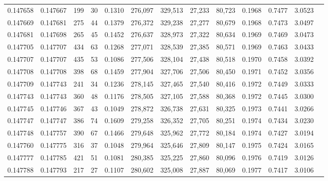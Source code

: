 \begin{tabular}{rrrrrrrrrrrrr}
0.147658 & 0.147667 &   199 &  30 &                                     0.1310 & 276,097 & 329,513 &  27,233 &  80,723 & 0.1968 & 0.7477 & 3.0523 \\
0.147669 & 0.147681 &   275 &  44 &                                     0.1379 & 276,372 & 329,238 &  27,277 &  80,679 & 0.1968 & 0.7473 & 3.0497 \\
0.147681 & 0.147698 &   265 &  45 &                                     0.1452 & 276,637 & 328,973 &  27,322 &  80,634 & 0.1969 & 0.7469 & 3.0473 \\
0.147705 & 0.147707 &   434 &  63 &                                     0.1268 & 277,071 & 328,539 &  27,385 &  80,571 & 0.1969 & 0.7463 & 3.0433 \\
0.147707 & 0.147707 &   435 &  53 &                                     0.1086 & 277,506 & 328,104 &  27,438 &  80,518 & 0.1970 & 0.7458 & 3.0392 \\
0.147708 & 0.147708 &   398 &  68 &                                     0.1459 & 277,904 & 327,706 &  27,506 &  80,450 & 0.1971 & 0.7452 & 3.0356 \\
0.147709 & 0.147743 &   241 &  34 &                                     0.1236 & 278,145 & 327,465 &  27,540 &  80,416 & 0.1972 & 0.7449 & 3.0333 \\
0.147743 & 0.147743 &   360 &  48 &                                     0.1176 & 278,505 & 327,105 &  27,588 &  80,368 & 0.1972 & 0.7445 & 3.0300 \\
0.147745 & 0.147746 &   367 &  43 &                                     0.1049 & 278,872 & 326,738 &  27,631 &  80,325 & 0.1973 & 0.7441 & 3.0266 \\
0.147747 & 0.147747 &   386 &  74 &                                     0.1609 & 279,258 & 326,352 &  27,705 &  80,251 & 0.1974 & 0.7434 & 3.0230 \\
0.147748 & 0.147757 &   390 &  67 &                                     0.1466 & 279,648 & 325,962 &  27,772 &  80,184 & 0.1974 & 0.7427 & 3.0194 \\
0.147760 & 0.147775 &   316 &  37 &                                     0.1048 & 279,964 & 325,646 &  27,809 &  80,147 & 0.1975 & 0.7424 & 3.0165 \\
0.147777 & 0.147785 &   421 &  51 &                                     0.1081 & 280,385 & 325,225 &  27,860 &  80,096 & 0.1976 & 0.7419 & 3.0126 \\
0.147788 & 0.147793 &   217 &  27 &                                     0.1107 & 280,602 & 325,008 &  27,887 &  80,069 & 0.1977 & 0.7417 & 3.0106 \\

\end{tabular}
